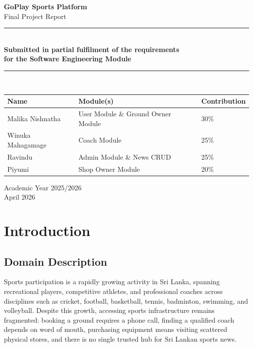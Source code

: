 \documentclass[12pt,a4paper]{report}
\begin{document}
\begin{titlepage}
\centering\vspace*{1.5cm}
{\Huge\bfseries\color{primary} GoPlay Sports Platform}\\[0.8cm]
{\LARGE Final Project Report}\\[1.5cm]
\rule{\textwidth}{1.5pt}\\[0.5cm]
{\large\bfseries Submitted in partial fulfilment of the requirements\\
for the Software Engineering Module}\\[0.5cm]
\rule{\textwidth}{1.5pt}\\[2cm]

\begin{tabular}{lll}
\toprule
\textbf{Name} & \textbf{Module(s)} & \textbf{Contribution}\\
\midrule
Malika Nishnatha   & User Module \& Ground Owner Module & 30\%\\
Winuka Mahagamage  & Coach Module                       & 25\%\\
Ravindu            & Admin Module \& News CRUD           & 25\%\\
Piyumi             & Shop Owner Module                  & 20\%\\
\bottomrule
\end{tabular}

\vfill
{\large Academic Year 2025/2026}\\[0.3cm]
{\large April 2026}
\end{titlepage}

\tableofcontents\newpage

\chapter{Introduction}

\section{Domain Description}

Sports participation is a rapidly growing activity in Sri Lanka, spanning recreational players, competitive athletes, and professional coaches across disciplines such as cricket, football, basketball, tennis, badminton, swimming, and volleyball. Despite this growth, accessing sports infrastructure remains fragmented: booking a ground requires a phone call, finding a qualified coach depends on word of mouth, purchasing equipment means visiting scattered physical stores, and there is no single trusted hub for Sri Lankan sports news.
\end{document}
